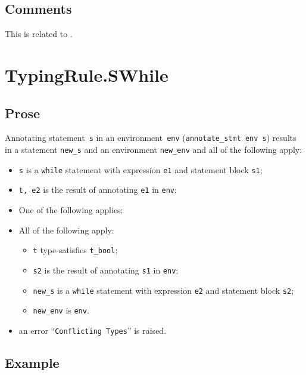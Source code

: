 \documentclass{book}
\begin{document}
\begin{itemize}
\subsection{Comments}
    This is related to .


\section{TypingRule.SWhile \label{sec:TypingRule.SWhile}}

  \subsection{Prose}
Annotating statement~\texttt{s} in an environment~\texttt{env}
(\texttt{annotate\_stmt env s}) results in a statement \texttt{new\_s} and an
environment \texttt{new\_env} and all of the following apply:
   \begin{itemize}
   \item \texttt{s} is a \texttt{while} statement with expression \texttt{e1} and statement block \texttt{s1};
   \item \texttt{t, e2} is the result of annotating \texttt{e1} in \texttt{env};
   \item One of the following applies:
     \item All of the following apply:
       \begin{itemize}
       \item \texttt{t} type-satisfies \texttt{t\_bool};
       \item \texttt{s2} is the result of annotating \texttt{s1} in \texttt{env};
       \item \texttt{new\_s} is a \texttt{while} statement with expression \texttt{e2} and statement block \texttt{s2};
       \item \texttt{new\_env} is \texttt{env}.
       \end{itemize}
     \item an error ``\texttt{Conflicting Types}'' is raised.
   \end{itemize}

  \subsection{Example}



\begin{emptyformal}

\end{emptyformal}
\end{itemize}
\end{document}
